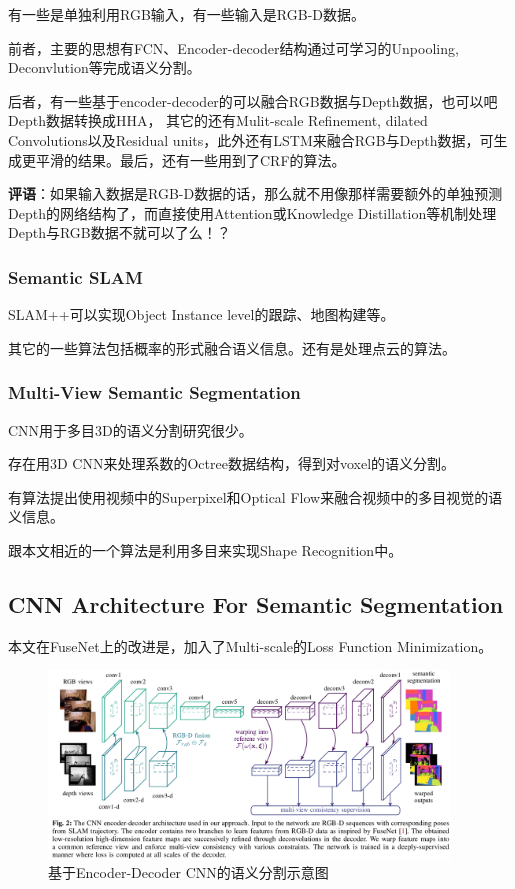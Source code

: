 有一些是单独利用RGB输入，有一些输入是RGB-D数据。

前者，主要的思想有FCN、Encoder-decoder结构通过可学习的Unpooling, Deconvlution等完成语义分割。

后者，有一些基于encoder-decoder的可以融合RGB数据与Depth数据，也可以吧Depth数据转换成HHA， 其它的还有Mulit-scale Refinement, dilated Convolutions以及Residual units，此外还有LSTM来融合RGB与Depth数据，可生成更平滑的结果。最后，还有一些用到了CRF的算法。

{\color{red} \textbf{评语}：如果输入数据是RGB-D数据的话，那么就不用像\cite{Xu2018PADNet}那样需要额外的单独预测Depth的网络结构了，而直接使用Attention或Knowledge Distillation等机制处理Depth与RGB数据不就可以了么！？}

\subsubsection{Semantic SLAM}

SLAM++可以实现Object Instance level的跟踪、地图构建等。

其它的一些算法包括概率的形式融合语义信息。还有是处理点云的算法。


\subsubsection{Multi-View Semantic Segmentation}

CNN用于多目3D的语义分割研究很少。

存在用3D CNN来处理系数的Octree数据结构，得到对voxel的语义分割。

有算法提出使用视频中的Superpixel和Optical Flow来融合视频中的多目视觉的语义信息。

跟本文相近的一个算法是利用多目来实现Shape Recognition中。


\subsection{CNN Architecture For Semantic Segmentation}

本文在FuseNet上的改进是，加入了Multi-scale的Loss Function Minimization。

\begin{figure}[!hbtp]
\centering
\includegraphics[width=0.95\textwidth]{SemanticSLAM/MultiView0.png}
\caption{基于Encoder-Decoder CNN的语义分割示意图}
\label{MultiView0}
\end{figure}

